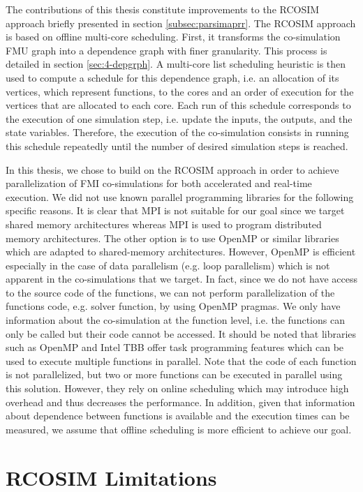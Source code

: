 The contributions of this thesis constitute improvements to the RCOSIM approach briefly presented in section \ref{subsec:parsimaprr}. The RCOSIM approach is based on offline multi-core scheduling. First, it transforms the co-simulation FMU graph into a dependence graph with finer granularity. This process is detailed in section \ref{sec:4-depgrph}. A multi-core list scheduling heuristic is then used to compute a schedule for this dependence graph, i.e. an allocation of its vertices, which represent functions, to the cores and an order of execution for the vertices that are allocated to each core. Each run of this schedule corresponds to the execution of one simulation step, i.e. update the inputs, the outputs, and the state variables. Therefore, the execution of the co-simulation consists in running this schedule repeatedly until the number of desired simulation steps is reached.

In this thesis, we chose to build on the RCOSIM approach in order to achieve parallelization of FMI co-simulations for both accelerated and real-time execution. We did not use known parallel programming libraries for the following specific reasons. It is clear that MPI is not suitable for our goal since we target shared memory architectures whereas MPI is used to program distributed memory architectures. The other option is to use OpenMP or similar libraries which are adapted to shared-memory architectures. However, OpenMP is efficient especially in the case of data parallelism (e.g. loop parallelism) which is not apparent in the co-simulations that we target. In fact, since we do not have access to the source code of the functions, we can not perform parallelization of the functions code, e.g. solver function, by using OpenMP pragmas. We only have information about the co-simulation at the function level, i.e. the functions can only be called but their code cannot be accessed. It should be noted that libraries such as OpenMP and Intel TBB offer task programming features which can be used to execute multiple functions in parallel. Note that the code of each function is not parallelized, but two or more functions can be executed in parallel using this solution. However, they rely on online scheduling which may introduce high overhead and thus decreases the performance. In addition, given that information about dependence between functions is available and the execution times can be measured, we assume that offline scheduling is more efficient to achieve our goal.   

\section{RCOSIM Limitations}

